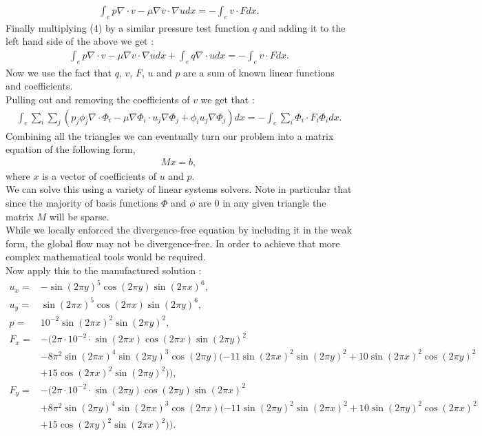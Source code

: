 \documentclass[11pt,twoside,a4paper]{article}
\begin{document}
\begin{align*}
\int_{e} p \nabla \cdot v - \mu \nabla v \cdot \nabla u dx = -\int_{e} v \cdot F dx .
\end{align*}
Finally multiplying (4) by a similar pressure test function $q$ and adding it to the left hand side of the above we get :
\begin{align}
\int_{e} p \nabla \cdot v - \mu \nabla v \cdot \nabla u dx + \int_{e} q \nabla \cdot u dx = -\int_{e} v \cdot F dx .
\end{align}
Now we use the fact that $q$, $v$, $F$, $u$ and $p$ are a sum of known linear functions and coefficients.\\
Pulling out and removing the coefficients of $v$ we get that :
\begin{align*}
 \int_{e} \sum_i \sum_j (  p_j \phi_j \nabla  \cdot \Phi_i - \mu \nabla \Phi_i \cdot u_j \nabla \Phi_j +   \phi_i u_j \nabla \Phi_j) dx = -\int_{e} \sum_i \Phi_i \cdot F_i \Phi_i dx .
\end{align*}
Combining all the triangles we can eventually turn our problem into a matrix equation of the following form,
\begin{align}
M x = b ,
\end{align}
where $x$ is a vector of coefficients of $u$ and $p$.\\
We can solve this using a variety of linear systems solvers. Note in particular that since the majority of basis functions $\Phi$ and $\phi$ are $0$ in any given triangle the matrix $M$ will be sparse.\\
While we locally enforced the divergence-free equation by including it in the weak form, the global flow may not be divergence-free. In order to achieve that more complex mathematical tools would be required.\\
Now apply this to the manufactured solution :
\begin{align*}
u_x =  &-\sin(2 \pi y)^5 \cos(2 \pi y)  \sin(2 \pi x)^6, \\
u_y = &\sin(2 \pi x)^5 \cos(2 \pi x)  \sin(2 \pi y)^6, \\
p = &10^{-2} \sin(2 \pi x)^2 \sin(2 \pi y)^2, \\
F_x =& -(2 \pi \cdot 10^{-2} \cdot \sin( 2 \pi x) \cos(2 \pi x) \sin(2 \pi y)^2 \\
	&- 8 \pi^2 \sin(2 \pi x)^4 \sin(2 \pi y)^3 \cos(2 \pi y)(-11 \sin(2 \pi x)^2 \sin(2 \pi y)^2 + 10 \sin(2 \pi x)^2 \cos(2 \pi y)^2 \\
	& + 15 \cos(2 \pi x)^2 \sin(2 \pi y)^2 )),\\
F_y = &-(2 \pi \cdot 10^{-2} \cdot \sin( 2 \pi y) \cos(2 \pi y) \sin(2 \pi x)^2 \\
	&+ 8 \pi^2 \sin(2 \pi y)^4 \sin(2 \pi x)^3 \cos(2 \pi x)(-11 \sin(2 \pi y)^2 \sin(2 \pi x)^2 + 10 \sin(2 \pi y)^2 \cos(2 \pi x)^2 \\
	&+ 15 \cos(2 \pi y)^2 \sin(2 \pi x)^2 )).
\end{align*}
\end{document}
